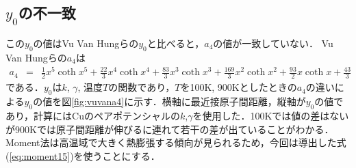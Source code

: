 \subsection{$y_0$の不一致}
この$y_0$の値はVu Van Hungらの$y_0$と比べると，$a_4$の値が一致していない\cite[p.515]{jindo2}．
Vu Van Hungらの$a_4$は
\begin{eqnarray}
\label{eq:vua4}
a_4&=&
\frac{1}{2}x^5 \coth x^5
+\frac{22}{3}x^4 \coth x^4
+\frac{83}{3}x^3 \coth x^3
+\frac{169}{3}x^2 \coth x^2
+\frac{93}{2}x \coth x
+\frac{43}{3}\nonumber
\end{eqnarray}
である．$y_0$は$k$, $\gamma$, 温度$T$の関数であり，$T$を100K, 900Kとしたときの$a_4$の違いによる$y_0$の値を図\ref{fig:vuvana4}に示す．横軸に最近接原子間距離，縦軸が$y_0$の値であり，計算にはCuのペアポテンシャルの$k$,$\gamma$を使用した．100Kでは値の差はないが900Kでは原子間距離が伸びるに連れて若干の差が出ていることがわかる．Moment法は高温域で大きく熱膨張する傾向が見られるため，今回は導出した式(\ref{eq:moment15})を使うことにする．
